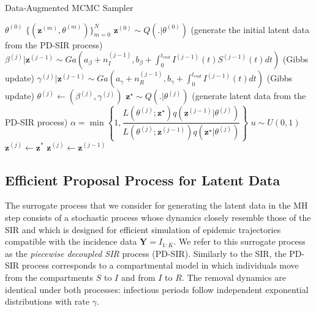 \documentclass[12pt]{article}
\begin{document}
\begin{algorithm}
	\caption{Data-Augmented MCMC Sampler}
	\label{alg:DA-MCMC}
	\begin{algorithmic}
		\REQUIRE $\theta^{(0)}$
		\RETURN $\{(\mathbf{z}^{(m)}, \theta^{(m)})\}_{m=0}^N$ 
		\STATE $\mathbf{z}^{(0)} \sim Q(.|\theta^{(0)})$ (generate the initial latent data from the PD-SIR process)
		\STATE $\beta^{(j)}|\mathbf{z}^{(j - 1)} \sim Ga\left( a_{\beta} + n_I^{(j - 1)}, b_{\beta} + \int_{0}^{t_{end}} I^{(j - 1)}(t)S^{(j - 1)}(t)dt\right)$ (Gibbs update)
		\STATE $\gamma^{(j)}|\mathbf{z}^{(j-1)} \sim Ga\left( a_{\gamma} + n_R^{(j - 1)}, b_{\gamma} + \int_{0}^{t_{end}} I^{(j - 1)}(t) dt\right)$ (Gibbs update)
		\STATE $\theta^{(j)} \leftarrow (\beta^{(j)}, \gamma^{(j)})$
		\STATE $\mathbf{z}^\star \sim Q(.|\theta^{(j)})$ (generate latent data from the PD-SIR process)
		\STATE $\alpha = \min\left\lbrace 1, \dfrac{L(\theta^{(j)}; \mathbf{z}^\star)q(\mathbf{z}^{(j - 1)}|\theta^{(j)})}{L(\theta^{(j)}; \mathbf{z}^{(j - 1)})q(\mathbf{z}^\star|\theta^{(j)})}\right\rbrace  $
		\STATE $u \sim U(0,1)$
		\STATE $\mathbf{z}^{(j)} \leftarrow \mathbf{z}^*$			
		\ELSE
		\STATE $\mathbf{z}^{(j)} \leftarrow \mathbf{z}^{(j - 1)}$
		\ENDIF
		\ENDFOR
	\end{algorithmic}
\end{algorithm}


\subsection{Efficient Proposal Process for Latent Data}
\label{sec:pds}

The surrogate process that we consider for generating the latent data in the MH step consists of a stochastic process whose dynamics closely resemble those of the SIR and which is designed for efficient simulation of epidemic trajectories compatible with the incidence data $\mathbf{Y} = I_{1:K}$. We refer to this surrogate process as the \textit{piecewise decoupled SIR} process (PD-SIR).
Similarly to the SIR, the PD-SIR process corresponds to a compartmental model in which individuals move from the compartments $S$ to $I$ and from $I$ to $R$.
The removal dynamics are identical under both processes: infectious periods follow independent exponential distributions with rate $\gamma$.
\end{document}
